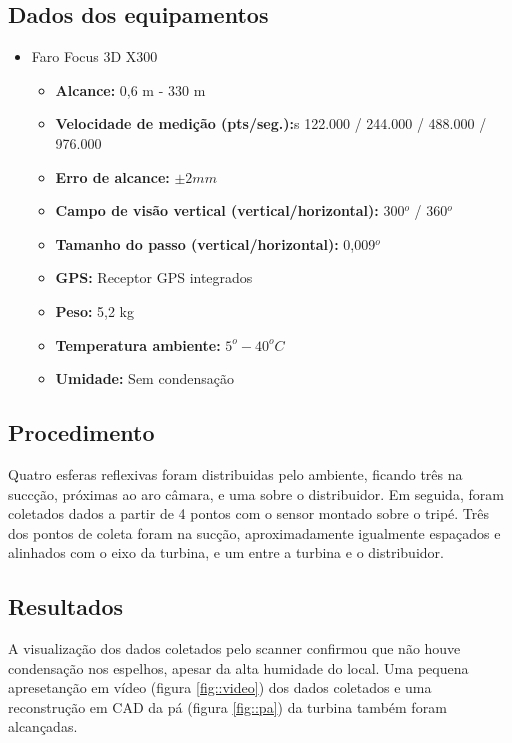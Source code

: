 \subsection{Dados dos equipamentos}

\begin{itemize}
  \item Faro Focus 3D X300
  \begin{itemize}
    \item \textbf{Alcance:} 0,6 m - 330 m
    \item \textbf{Velocidade de medição (pts/seg.):}s 122.000 / 244.000 /
    488.000 / 976.000
    \item \textbf{Erro de alcance:} $\pm 2 mm$
    \item \textbf{Campo de visão vertical (vertical/horizontal):} 300$^o$ /
    360$^o$
    \item \textbf{Tamanho do passo (vertical/horizontal):} 0,009$^o$
    \item \textbf{GPS:} Receptor GPS integrados
    \item \textbf{Peso:} 5,2 kg
    \item \textbf{Temperatura ambiente:} $5^o - 40^o C$
    \item \textbf{Umidade:} Sem condensação
  \end{itemize}
\end{itemize}

\subsection{Procedimento}

Quatro esferas reflexivas foram distribuidas pelo ambiente, ficando três na
succção, próximas ao aro câmara, e uma sobre o distribuidor. Em seguida, foram
coletados dados a partir de 4 pontos com o sensor montado sobre o tripé. Três
dos pontos de coleta foram na sucção, aproximadamente igualmente espaçados e
alinhados com o eixo da turbina, e um entre a turbina e o distribuidor.

\subsection{Resultados}

A visualização dos dados coletados pelo scanner confirmou que não houve
condensação nos espelhos, apesar da alta humidade do local. Uma pequena
apresetanção em vídeo (figura \ref{fig::video}) dos dados coletados e uma
reconstrução em CAD da pá (figura \ref{fig::pa}) da turbina também foram
alcançadas.

